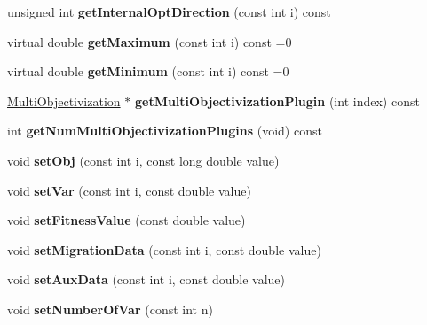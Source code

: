 \begin{DoxyCompactItemize}
unsigned int {\bfseries get\+Internal\+Opt\+Direction} (const int i) const
\item 
\mbox{\label{classIndividual_afa96281426e0b761c9054475173a53af}} 
virtual double {\bfseries get\+Maximum} (const int i) const =0
\item 
\mbox{\label{classIndividual_af40bb21011fa5725d5c81514d8954148}} 
virtual double {\bfseries get\+Minimum} (const int i) const =0
\item 
\mbox{\label{classIndividual_ac01510009bcdcee97a15c107cfcccbe1}} 
\mbox{\hyperlink{classMultiObjectivization}{Multi\+Objectivization}} $\ast$ {\bfseries get\+Multi\+Objectivization\+Plugin} (int index) const
\item 
\mbox{\label{classIndividual_aa68afefaff7dac801e0c06a438c31edf}} 
int {\bfseries get\+Num\+Multi\+Objectivization\+Plugins} (void) const
\item 
\mbox{\label{classIndividual_ae3922aadae6b6f49656b9175ec1a6a90}} 
void {\bfseries set\+Obj} (const int i, const long double value)
\item 
\mbox{\label{classIndividual_af80f0f301bf71944e44a1336a1d02275}} 
void {\bfseries set\+Var} (const int i, const double value)
\item 
\mbox{\label{classIndividual_ad89e179d02713b647f751c73a5cd5978}} 
void {\bfseries set\+Fitness\+Value} (const double value)
\item 
\mbox{\label{classIndividual_ad51b2cd41c4370b7b834b5f71ec18a09}} 
void {\bfseries set\+Migration\+Data} (const int i, const double value)
\item 
\mbox{\label{classIndividual_a82d3c3228f08e7b13469946fe6f4b6c4}} 
void {\bfseries set\+Aux\+Data} (const int i, const double value)
\item 
\mbox{\label{classIndividual_a632f3937b6a074eba85cb268e13cf98c}} 
void {\bfseries set\+Number\+Of\+Var} (const int n)
\item 
\mbox{\label{classIndividual_a57b610304fdb2b7ef442c287472df7dc}} 

\end{DoxyCompactItemize}
